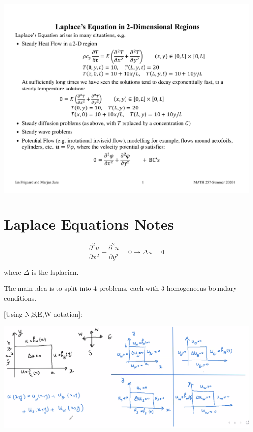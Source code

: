 \documentclass{article}
\begin{document}
\includegraphics[page=6, width = 0.8 \textwidth]{Laplace Equation.pdf}

\section{Laplace Equations Notes}

$$\frac{\partial^2 u}{\partial x^2} + \frac{\partial^2 u}{\partial y^2} = 0 \to \Delta u = 0$$

where $\Delta$ is the laplacian. 

The main idea is to split into 4 problems, each with 3 homogeneous boundary conditions. 

[Using N,S,E,W notation]:

\includegraphics[width = 0.95 \textwidth]{image11.png}
\end{document}
